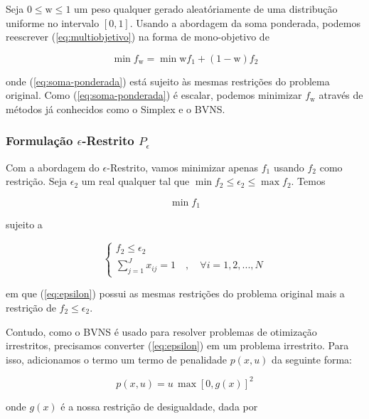 \documentclass[conference]{IEEEtran}
\begin{document}
Seja $0 \leq \mathrm{w} \leq 1$ um peso qualquer gerado aleatóriamente de uma distribução 
uniforme no intervalo $[0, 1]$. Usando a abordagem da soma ponderada, podemos reescrever 
(\ref{eq:multiobjetivo}) na forma de mono-objetivo de

\begin{equation} \label{eq:soma-ponderada}
	\min f_{\mathrm{w}} = \min \mathrm{w}f_1 + (1-\mathrm{w})f_2
\end{equation}

\noindent onde (\ref{eq:soma-ponderada}) está sujeito às mesmas restrições 
do problema original. Como (\ref{eq:soma-ponderada}) é escalar, podemos 
minimizar $f_{\mathrm{w}}$ através de métodos já conhecidos como o Simplex e o 
BVNS. 

\subsubsection{Formulação $\epsilon$-Restrito $P_{\epsilon}$}

Com a abordagem do $\epsilon$-Restrito, vamos minimizar apenas $f_1$ 
usando $f_2$ como restrição. Seja $\epsilon_2$ um real qualquer tal que  $\min f_2 \leq \epsilon_2 \leq \max f_2$.
Temos 

\begin{equation}\label{eq:epsilon}
	\min f_1
\end{equation}

\noindent sujeito a 

\begin{equation} \label{eq:rest-epsilon}
    \begin{cases}
      f_2 \leq \epsilon_2 \\
      \sum_{j=1}^{J} x_{ij} = 1 \quad , \quad \forall i = {1, 2, ..., N}
    \end{cases}       
\end{equation}

\noindent em que (\ref{eq:epsilon}) possui as mesmas restrições do problema original
mais a restrição de $f_2 \leq \epsilon_2$.

Contudo, como o BVNS é usado para resolver problemas de otimização irrestritos, 
precisamos converter (\ref{eq:epsilon}) em um problema irrestrito. Para isso, adicionamos o 
termo um termo de penalidade $p(x, u)$ da seguinte forma:

\[ p(x, u) = u \, \max \left[ 0, g(x) \right] ^2 \]

\noindent onde $g(x)$ é a nossa restrição de desigualdade, dada por 
\end{document}
